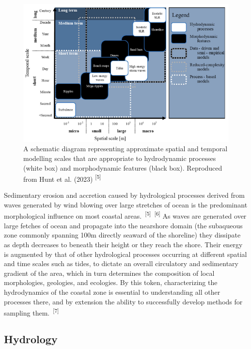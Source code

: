 \documentclass{article}
\begin{document}
\begin{figure}
    \centering
    \includegraphics[width=0.8\linewidth]{images/spatial-and-temporal.png}
    \caption{A schematic diagram representing approximate spatial and temporal modelling scales that are appropriate to hydrodynamic processes (white box) and morphodynamic features (black box). Reproduced from Hunt et al. (2023) \textsuperscript{[5]}}
    \label{figure1}
\end{figure}


\par{Sedimentary erosion and accretion caused by hydrological processes derived from waves generated by wind blowing over large stretches of ocean is the predominant morphological influence on most coastal areas.~\textsuperscript{[5]}~\textsuperscript{[6]} As waves are generated over large fetches of ocean and propagate into the nearshore domain (the subaqueous zone commonly spanning 100m directly seaward of the shoreline) they dissipate as depth decreases to beneath their height or they reach the shore. Their energy is augmented by that of other hydrological processes occurring at different spatial and time scales such as tides, to dictate an overall circulatory and sedimentary gradient of the area, which in turn determines the composition of local morphologies, geologies, and ecologies. By this token, characterizing the hydrodynamics of the coastal zone is essential to understanding all other processes there, and by extension the ability to successfully develop methods for sampling them.~\textsuperscript{[7]}}


\subsection{Hydrology}
\end{document}
